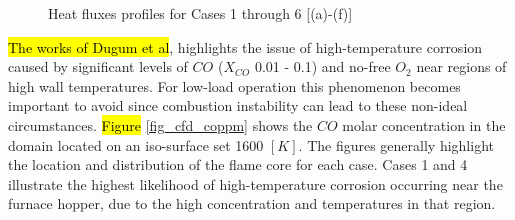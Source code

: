 \documentclass[twocolumn,10pt]{asme2ej}
\begin{document}
\begin{figure}[h!]
\hspace{10mm}
\hspace{10mm}
\caption{Heat fluxes profiles for Cases 1 through 6 [(a)-(f)]}
\label{fig_cfd_heat_flux}
\end{figure}
\newpage
\hl{The works of Dugum et al}\cite{ugum2019}, highlights the issue of high-temperature corrosion caused by significant levels of $CO$ ($X_{CO}$ 0.01 - 0.1) and no-free $O_2$ near regions of high wall temperatures. For low-load operation this phenomenon becomes important to avoid since combustion instability can lead to these non-ideal circumstances. \hl{Figure} \ref{fig_cfd_coppm} shows the $CO$ molar concentration in the domain located on an iso-surface set 1600 $[K]$. The figures generally highlight the location and distribution of the flame core for each case. Cases 1 and 4 illustrate the highest likelihood of high-temperature corrosion occurring near the furnace hopper, due to the high concentration and temperatures in that region.\\
\end{document}
